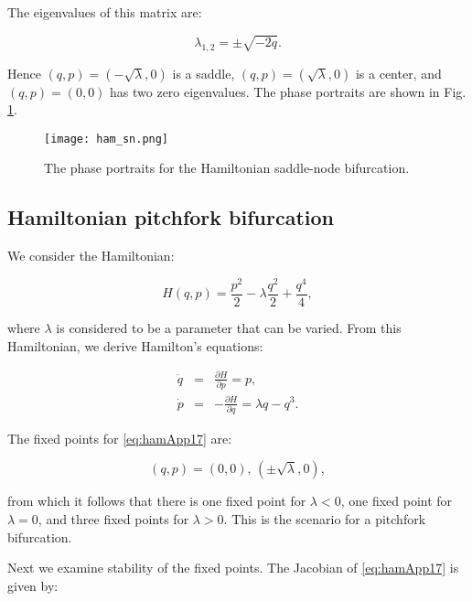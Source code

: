 \documentclass{article}
\begin{document}
\noindent
The eigenvalues of this matrix are:

\[
\lambda_{1, 2} = \pm \sqrt{-2q}.
\]

\noindent
Hence $(q, p) = (-\sqrt{\lambda}, 0)$ is a saddle, $(q, p) = (\sqrt{\lambda}, 0)$ is a center, and $(q, p) = (0, 0)$  has two zero eigenvalues. The phase portraits are shown in Fig. \ref{fig:appC_fig3}.




 \begin{figure}[htb!]
\begin{center}
\texttt{[image: ham\_sn.png]}
\end{center}
\caption{The phase portraits for the Hamiltonian saddle-node bifurcation.}
\label{fig:appC_fig3}
\end{figure}




\subsection*{Hamiltonian pitchfork bifurcation}

We consider the Hamiltonian:

\begin{equation}
H (q, p) = \frac{p^2}{2} - \lambda \frac{q^2}{2} + \frac{q^4}{4},
\label{eq:hamApp16}
\end{equation}

\noindent
where $\lambda$ is considered to be a parameter that can be varied. From this Hamiltonian, we derive Hamilton's equations:

\begin{eqnarray}
\dot{q} & = & \frac{\partial H}{\partial p} = p, \nonumber \\
\dot{p} & = & -\frac{\partial H}{\partial q} =\lambda q  -  q^3.
\label{eq:hamApp17}
\end{eqnarray}

\noindent
The fixed points for \eqref{eq:hamApp17} are:

\begin{equation}
(q, p) = (0, 0), \, (\pm\sqrt{\lambda}, 0),
\end{equation}

\noindent
from which it follows that there is one fixed point  for $\lambda <0$, one fixed point for $\lambda =0$, and  three fixed points for $\lambda >0$. This is the scenario for a pitchfork  bifurcation.

Next we examine stability of the fixed points. The Jacobian of \eqref{eq:hamApp17} is given by:
\end{document}
